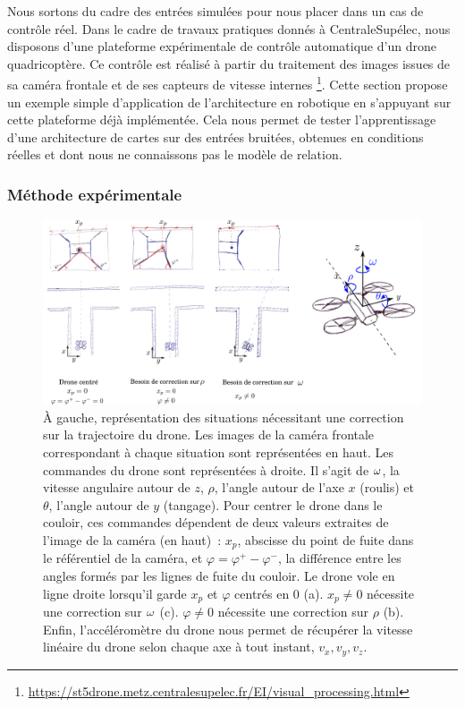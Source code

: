 \documentclass[../main]{subfiles}
\begin{document}
Nous sortons du cadre des entrées simulées pour nous placer dans un cas de contrôle réel.
Dans le cadre de travaux pratiques donnés à CentraleSupélec, nous disposons d'une plateforme expérimentale de contrôle automatique d'un drone quadricoptère.
Ce contrôle est réalisé à partir du traitement des images issues de sa caméra frontale et de ses capteurs de vitesse internes \footnote{\url{https://st5drone.metz.centralesupelec.fr/EI/visual_processing.html}}.
Cette section propose un exemple simple d'application de l'architecture en robotique en s'appuyant sur cette plateforme déjà implémentée. Cela nous permet de tester l'apprentissage d'une architecture de cartes sur des entrées bruitées, obtenues en conditions réelles et dont nous ne connaissons pas le modèle de relation.

\subsubsection{Méthode expérimentale}

\begin{figure}
	\centering\includegraphics[width=\textwidth]{vp_drone.pdf}
	\caption{\`A gauche, représentation des situations nécessitant une correction sur la trajectoire du drone. Les images de la caméra frontale correspondant à chaque situation sont représentées en haut.
	Les commandes du drone sont représentées à droite. Il s'agit de $\omega$, la vitesse angulaire autour de $z$, $\rho$, l'angle autour de l'axe $x$ (roulis) et $\theta$, l'angle autour de $y$ (tangage). 
	Pour centrer le drone dans le couloir, ces commandes dépendent de deux valeurs extraites de l'image de la caméra (en haut)~: $x_p$, abscisse du point de fuite dans le référentiel de la caméra, et $\varphi = \varphi^+ - \varphi^-$, la différence entre les angles formés par les lignes de fuite du couloir.
	Le drone vole en ligne droite lorsqu'il garde $x_p$ et $\varphi$ centrés en 0 (a).
	$x_p \neq 0$ nécessite une correction sur $\omega$ (c). 
	$\varphi \neq 0$ nécessite une correction sur $\rho$ (b).
	Enfin, l'accéléromètre du drone nous permet de récupérer la vitesse linéaire du drone selon chaque axe à tout instant, $v_x,v_y,v_z$.
	}
	\label{fig:drone}
	\end{figure}
\end{document}
